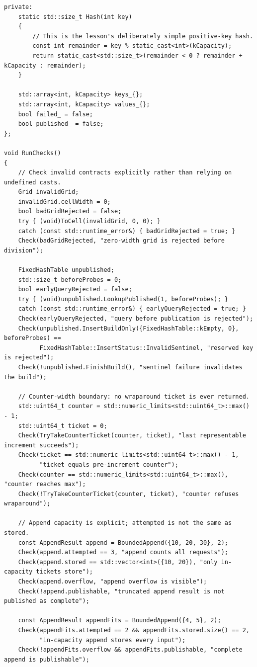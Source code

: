 \begin{verbatim}
private:
    static std::size_t Hash(int key)
    {
        // This is the lesson's deliberately simple positive-key hash.
        const int remainder = key % static_cast<int>(kCapacity);
        return static_cast<std::size_t>(remainder < 0 ? remainder + kCapacity : remainder);
    }

    std::array<int, kCapacity> keys_{};
    std::array<int, kCapacity> values_{};
    bool failed_ = false;
    bool published_ = false;
};

void RunChecks()
{
    // Check invalid contracts explicitly rather than relying on undefined casts.
    Grid invalidGrid;
    invalidGrid.cellWidth = 0;
    bool badGridRejected = false;
    try { (void)ToCell(invalidGrid, 0, 0); }
    catch (const std::runtime_error&) { badGridRejected = true; }
    Check(badGridRejected, "zero-width grid is rejected before division");

    FixedHashTable unpublished;
    std::size_t beforeProbes = 0;
    bool earlyQueryRejected = false;
    try { (void)unpublished.LookupPublished(1, beforeProbes); }
    catch (const std::runtime_error&) { earlyQueryRejected = true; }
    Check(earlyQueryRejected, "query before publication is rejected");
    Check(unpublished.InsertBuildOnly({FixedHashTable::kEmpty, 0}, beforeProbes) ==
          FixedHashTable::InsertStatus::InvalidSentinel, "reserved key is rejected");
    Check(!unpublished.FinishBuild(), "sentinel failure invalidates the build");

    // Counter-width boundary: no wraparound ticket is ever returned.
    std::uint64_t counter = std::numeric_limits<std::uint64_t>::max() - 1;
    std::uint64_t ticket = 0;
    Check(TryTakeCounterTicket(counter, ticket), "last representable increment succeeds");
    Check(ticket == std::numeric_limits<std::uint64_t>::max() - 1,
          "ticket equals pre-increment counter");
    Check(counter == std::numeric_limits<std::uint64_t>::max(), "counter reaches max");
    Check(!TryTakeCounterTicket(counter, ticket), "counter refuses wraparound");

    // Append capacity is explicit; attempted is not the same as stored.
    const AppendResult append = BoundedAppend({10, 20, 30}, 2);
    Check(append.attempted == 3, "append counts all requests");
    Check(append.stored == std::vector<int>({10, 20}), "only in-capacity tickets store");
    Check(append.overflow, "append overflow is visible");
    Check(!append.publishable, "truncated append result is not published as complete");

    const AppendResult appendFits = BoundedAppend({4, 5}, 2);
    Check(appendFits.attempted == 2 && appendFits.stored.size() == 2,
          "in-capacity append stores every input");
    Check(!appendFits.overflow && appendFits.publishable, "complete append is publishable");


\end{verbatim}
